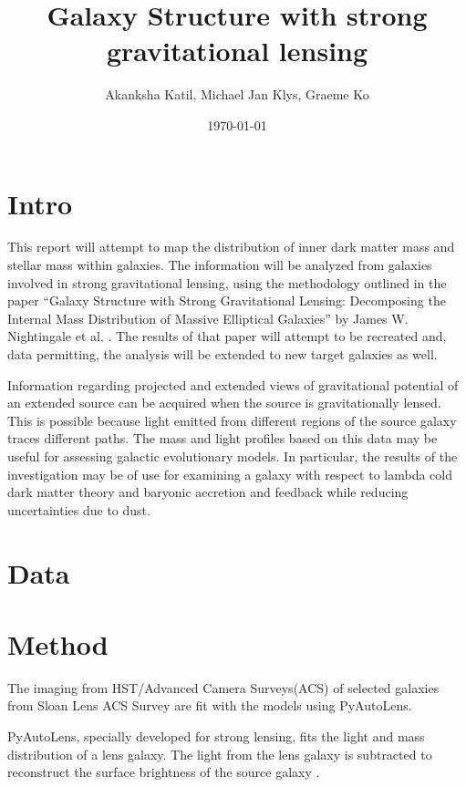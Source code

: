 \documentclass{article}
\title{Galaxy Structure with strong gravitational lensing}
\author{Akanksha Katil, Michael Jan Klys, Graeme Ko}
\date{\today}
\begin{document}
\maketitle

\section{Intro}

This report will attempt to map the distribution of inner dark matter mass and stellar mass within galaxies. The information will be analyzed from galaxies involved in strong gravitational lensing, using the methodology outlined in the paper “Galaxy Structure with Strong Gravitational Lensing: Decomposing the Internal Mass Distribution of Massive Elliptical Galaxies” by James W. Nightingale et al. \cite{Nightingale_2019}. The results of that paper will attempt to be recreated and, data permitting, the analysis will be extended to new target galaxies as well. 

Information regarding projected and extended views of gravitational potential of an extended source can be acquired when the source is gravitationally lensed. This is possible because light emitted from different regions of the source galaxy traces different paths. The mass and light profiles based on this data may be useful for assessing galactic evolutionary models. In particular, the results of the investigation may be of use for examining a galaxy with respect to lambda cold dark matter theory and baryonic accretion and feedback while reducing uncertainties due to dust. \cite{Nightingale_2019} 



\section{Data}


\section{Method}

The imaging from HST/Advanced Camera Surveys(ACS) of selected galaxies from Sloan Lens ACS Survey\cite{bolton2008sloan} are fit with the models using PyAutoLens\cite{Nightingale_2021}. 

PyAutoLens, specially developed for strong lensing, fits the light and mass distribution of a lens galaxy. The light from the lens galaxy is subtracted to reconstruct the surface brightness of the source galaxy \cite{Nightingale_2021}. 
\end{document}

